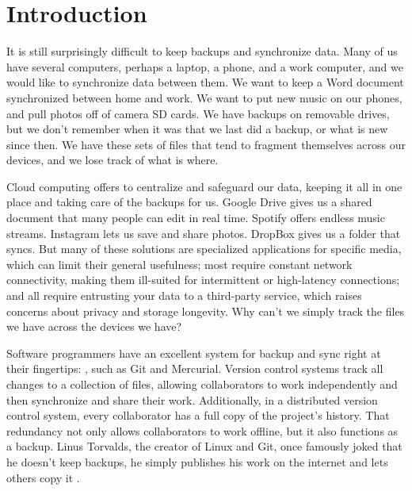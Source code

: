 \chapter{Introduction}

It is still surprisingly difficult to keep backups and synchronize data. Many of
us have several computers, perhaps a laptop, a phone, and a work computer, and
we would like to synchronize data between them. We want to keep a Word document
synchronized between home and work. We want to put new music on our phones, and
pull photos off of camera SD cards. We have backups on removable drives, but we
don't remember when it was that we last did a backup, or what is new since then.
We have these sets of files that tend to fragment themselves across our devices,
and we lose track of what is where.

Cloud computing offers to centralize and safeguard our data, keeping it all in
one place and taking care of the backups for us. Google Drive gives us a shared
document that many people can edit in real time. Spotify offers endless music
streams. Instagram lets us save and share photos. DropBox gives us a folder that
syncs. But many of these solutions are specialized applications for specific
media, which can limit their general usefulness; most require constant network
connectivity, making them ill-suited for intermittent or high-latency
connections; and all require entrusting your data to a third-party service,
which raises concerns about privacy and storage longevity. Why can't we simply
track the files we have across the devices we have?


Software programmers have an excellent system for backup and sync right at their
fingertips: , such as Git
and Mercurial. Version control systems track all changes to a collection of
files, allowing collaborators to work independently and then synchronize and
share their work. Additionally, in a distributed version control system, every
collaborator has a full copy of the project's history. That redundancy not only
allows collaborators to work offline, but it also functions as a backup. Linus
Torvalds, the creator of Linux and Git, once famously joked that he doesn't keep
backups, he simply publishes his work on the internet and lets others copy it
\cite{linus_no_backups}.

